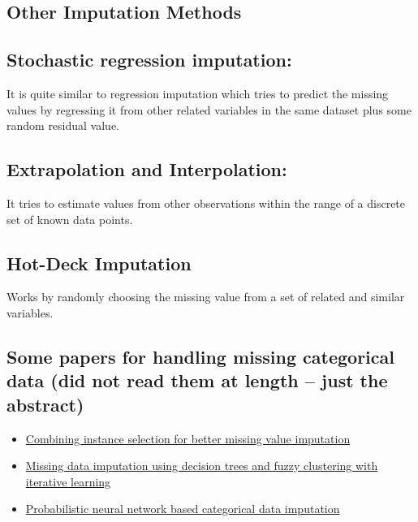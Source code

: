 \documentclass{article}
\begin{document}
\subsection*{Other Imputation Methods}
\subsection{Stochastic regression imputation:}
It is quite similar to regression imputation which tries to predict the missing values by regressing it from other related variables in the same dataset plus some random residual value.

\subsection{Extrapolation and Interpolation:}
It tries to estimate values from other observations within the range of a discrete set of known data points.

\subsection{Hot-Deck Imputation}
Works by randomly choosing the missing value from a set of related and similar variables.

\subsection{Some papers for handling missing categorical data (did not read them at length -- just the abstract)}

\begin{itemize}
\item \href{https://www.sciencedirect.com/science/article/abs/pii/S0164121216301583?casa_token=ZELiCdTNfw4AAAAA:_dpjT3fvcxOkRXX1po7HaCnzb02biPjrKEYw-j8d7OU_krEYFqaaQIIwQo3rki5tbUWitsJstA}{Combining instance selection for better missing value imputation}
\item \href{https://link.springer.com/article/10.1007/s10115-019-01427-1}{Missing data imputation using decision trees and fuzzy clustering with iterative learning}
\item \href{https://www.sciencedirect.com/science/article/abs/pii/S0925231216309407?casa_token=dC_ROkr-pWoAAAAA:s5zwIWUilFRt2zbv5YcFVu6kzsNhdZN3c_OfUpQ1s1e-f9-c4VqcB1_OnXS-kGF0-kPzctFJ9A}{Probabilistic neural network based categorical data imputation}
\end{itemize}
\end{document}
